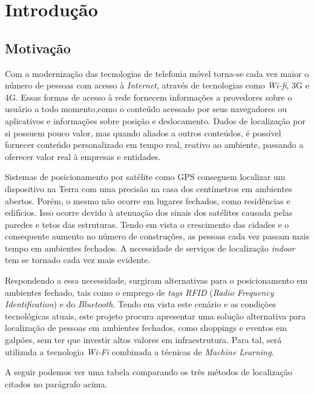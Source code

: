 \chapter{Introdução}\label{chp:introduction}

\section{Motivação}\label{sec:motivation}
Com a modernização das tecnologias de telefonia móvel torna-se cada vez maior o
número de pessoas com acesso à \textit{Internet}, através de tecnologias como \textit{Wi-fi},
3G e 4G. Essas formas de acesso à rede fornecem informações a provedores sobre o
usuário a todo momento,como o conteúdo acessado por seus navegadores ou aplicativos
e informações sobre posição e deslocamento. Dados de localização por si possuem
pouco valor, mas quando aliados a outros conteúdos, é possível fornecer conteúdo
personalizado em tempo real, reativo ao ambiente, passando a oferecer valor real
à empresas e entidades.
\par
Sistemas de posicionamento por satélite como GPS conseguem localizar um dispositivo
na Terra com uma precisão na casa dos centímetros em ambientes abertos. Porém,
o mesmo não ocorre em lugares fechados, como residências e edifícios. Isso ocorre
devido à atenuação dos sinais dos satélites causada pelas paredes e tetos das
estruturas. Tendo em vista o crescimento das cidades e o consequente aumento no
número de construções, as pessoas cada vez passam mais tempo em ambientes
fechados. A necessidade de serviços de localização \textit{indoor} tem se tornado cada
vez mais evidente.
\par
Respondendo a essa necessidade, surgiram alternativas para o posicionamento em
ambientes fechado, tais como o emprego de \textit{tags RFID} (\textit{Radio Frequency Identification}) e do \textit{Bluetooth}. Tendo em vista este
cenário e as condições tecnológicas atuais, este projeto procura apresentar uma
solução alternativa para localização de pessoas em ambientes fechados, como shoppings e
eventos em galpões, sem ter que investir altos valores em infraestrutura. Para tal, será utilizada a tecnologia \textit{Wi-Fi} combinada a técnicas de \textit{Machine Learning}.
\par
A seguir podemos ver uma tabela comparando os três métodos de localização citados no parágrafo acima.


